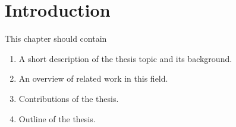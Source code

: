 
\chapter{Introduction}
\label{ch:introduction}

This chapter should contain
\begin{enumerate}
  \item A short description of the thesis topic and its background.
  \item An overview of related work in this field.
  \item Contributions of the thesis.
  \item Outline of the thesis.
\end{enumerate}